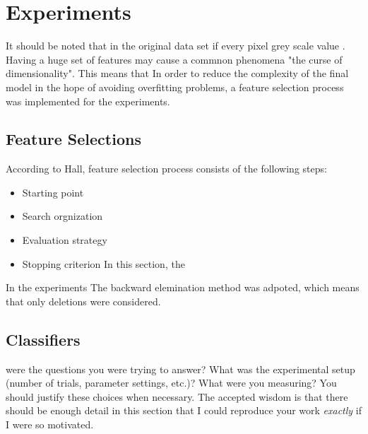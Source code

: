 
\section{Experiments}
\label{sec:expts}
It should be noted that in the original data set if every pixel grey scale value . Having a huge set of features may cause a commnon phenomena "the curse of dimensionality". This means that 
In order to reduce the complexity of the final model in the hope of avoiding overfitting problems, a feature selection process was implemented for the experiments.
\subsection{Feature Selections}
\label{feature}
According to Hall, feature selection process consists of the following steps:
\begin{itemize}
	\item Starting point
	\item Search orgnization
	\item Evaluation strategy
	\item Stopping criterion
In this section, the 
\end{itemize}

In the experiments
The backward elemination method was adpoted, which means that only deletions were considered.
\subsection{Classifiers}
\label{class}

were the questions you were trying to answer? What was the
experimental setup (number of trials, parameter settings, etc.)? What
were you measuring? You should justify these choices when
necessary. The accepted wisdom is that there should be enough detail
in this section that I could reproduce your work \emph{exactly} if I
were so motivated.
